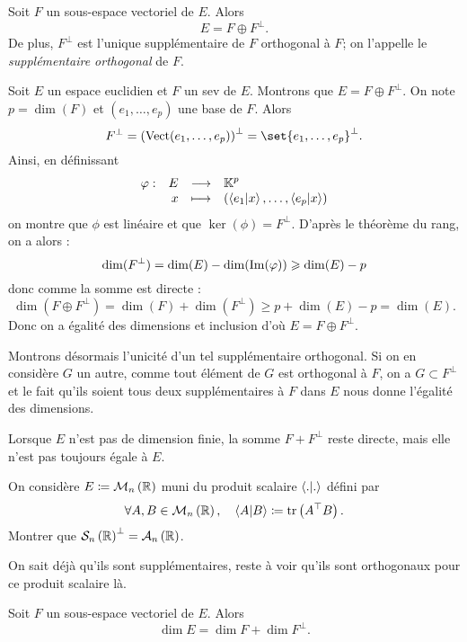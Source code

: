 \documentclass{magnolia}
\begin{document}
\begin{proposition}[utile=2]
Soit $F$ un sous-espace vectoriel de $E$. Alors
\[E=F\oplus F^{\perp}.\]
De plus, $F^\perp$ est l'unique supplémentaire de $F$ orthogonal à $F$; on
l'appelle le \emph{supplémentaire orthogonal} de $F$.
\end{proposition}

\begin{preuve}
Soit $E$ un espace euclidien et $F$ un sev de $E$. Montrons que $E=F\oplus F^{\perp}$. On note $p=\dim(F)$ et $(e_1,\ldots,e_p)$ une base de $F$. Alors $$F^\perp=\p{\vect(e_1,\ldots,e_p)}^\perp=\set{e_1,\ldots,e_p}^\perp.$$
Ainsi, en définissant $$\begin{array}[t]{lrcl} \displaystyle{\varphi} : & \displaystyle{E} & \longrightarrow & \displaystyle{\ensuremath{\mathbb{K}}^p} \\ & \displaystyle{x} & \longmapsto & \displaystyle{(\left\langle {e_1}\middle|{x}\right\rangle,\ldots,\left\langle {e_p}\middle|{x}\right\rangle)} \end{array}$$ on montre que $\phi$ est linéaire et que $\ker(\phi)=F^\perp$. D'après le théorème du rang, on a alors :
$$\dim(F^\perp)=\dim(E)-\dim(\operatorname{Im}(\varphi))\geqslant \dim(E)-p$$ donc comme la somme est directe :
$$\dim(F\oplus F^{\perp})=\dim(F)+\dim(F^{\perp})\geq p+\dim(E)-p=\dim(E).$$ Donc on a égalité des dimensions et inclusion d'où $E=F\oplus F^{\perp}$.

Montrons désormais l'unicité d'un tel supplémentaire orthogonal. Si on en considère $G$ un autre, comme tout élément de $G$ est orthogonal à $F$, on a $G\subset F^\perp$ et le fait qu'ils soient tous deux supplémentaires à $F$ dans $E$ nous donne l'égalité des dimensions.
\end{preuve}


\begin{remarqueUnique}
\remarque Lorsque $E$ n'est pas de dimension finie, la somme $F+ F^\perp$ reste
  directe, mais elle n'est pas toujours égale à $E$.
\end{remarqueUnique}


\begin{exoUnique}
  \exo On considère $E\coloneqq\mathcal{M}_{n}\left(\mathbb{R}\right)$ muni du produit scalaire $\left\langle {.}\middle|{.}\right\rangle$ défini par
    \[\forall A,B\in\mathcal{M}_{n}\left(\mathbb{R}\right) ,\quad \left\langle {A}\middle|{B}\right\rangle\coloneqq\operatorname{tr}\left({A}^{\top}B\right).\]
    Montrer que $\mathcal{S}_n\left(\mathbb{R}\right)^\perp=\mathcal{A}_n\left(\mathbb{R}\right)$.
    \begin{sol}
    On sait déjà qu'ils sont supplémentaires, reste à voir qu'ils sont orthogonaux pour ce produit scalaire là.
    \end{sol}
  \end{exoUnique}

\begin{proposition}[utile=-3]
Soit $F$ un sous-espace vectoriel de $E$. Alors
\[\dim E=\dim F+\dim F^\perp.\]
\end{proposition}
\end{document}
